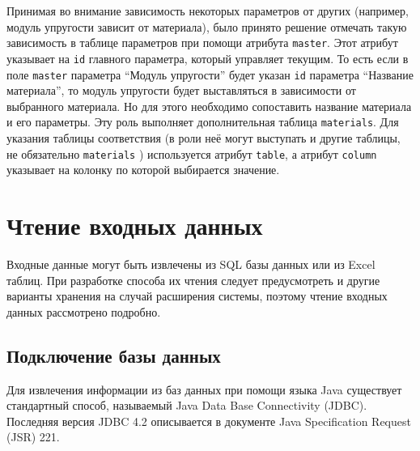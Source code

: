 \documentclass[14pt,oneside,final]{extreport}
\begin{document}
	Принимая во внимание зависимость некоторых параметров от других (например, модуль упругости зависит от материала), было принято решение отмечать такую зависимость в таблице параметров при помощи атрибута \texttt{master}. Этот атрибут указывает на \texttt{id} главного параметра, который управляет текущим. То есть если в поле \texttt{master} параметра ``Модуль упругости'' будет указан \texttt{id} параметра ``Название материала'', то модуль упругости будет выставляться в зависимости от выбранного материала. Но для этого необходимо сопоставить название материала и его параметры. Эту роль выполняет дополнительная таблица \texttt{materials}. Для указания таблицы соответствия (в роли неё могут выступать и другие таблицы, не обязательно \texttt{materials} ) используется атрибут \texttt{table}, а атрибут \texttt{column} указывает на колонку по которой выбирается значение. 
	

	
	\section{Чтение входных данных}
	Входные данные могут быть извлечены из SQL базы данных или из Excel таблиц. При разработке способа их чтения следует предусмотреть и другие варианты хранения на случай расширения системы, поэтому чтение входных данных рассмотрено подробно. 
	
	\subsection{Подключение базы данных}
	Для извлечения информации из баз данных при помощи языка Java существует стандартный способ, называемый Java Data Base Connectivity (JDBC). Последняя версия JDBC 4.2 описывается в документе Java Specification Request (JSR) 221. 
	
\end{document}
